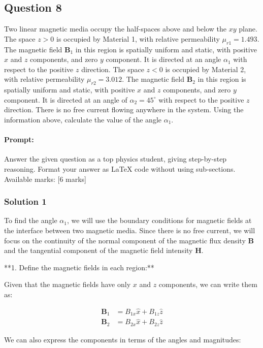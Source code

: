 \documentclass{article}
\begin{document}
\subsection{Question 8}
 Two linear magnetic media occupy the half-spaces above and below the $xy$ plane. The space $z > 0$ is occupied by Material 1, with relative permeability $\mu_{r1} = 1.493$. The magnetic field $\mathbf{B}_1$ in this region is spatially uniform and static, with positive $x$ and $z$ components, and zero $y$ component. It is directed at an angle $\alpha_1$ with respect to the positive $z$ direction. The space $z < 0$ is occupied by Material 2, with relative permeability $\mu_{r2} = 3.012$. The magnetic field $\mathbf{B}_2$ in this region is spatially uniform and static, with positive $x$ and $z$ components, and zero $y$ component. It is directed at an angle of $\alpha_2 = 45^\circ$ with respect to the positive $z$ direction. There is no free current flowing anywhere in the system. Using the information above, calculate the value of the angle $\alpha_1$.

\paragraph{Prompt: \\} 
Answer the given question as a top physics student, giving step-by-step reasoning. Format your answer as LaTeX code without using sub-sections. Available marks: [6 marks]

\subsubsection{Solution 1}
To find the angle $\alpha_1$, we will use the boundary conditions for magnetic fields at the interface between two magnetic media. Since there is no free current, we will focus on the continuity of the normal component of the magnetic flux density $\mathbf{B}$ and the tangential component of the magnetic field intensity $\mathbf{H}$.

**1. Define the magnetic fields in each region:**

Given that the magnetic fields have only $x$ and $z$ components, we can write them as:

\begin{align*}
\mathbf{B}_1 &= B_{1x} \hat{x} + B_{1z} \hat{z} \\
\mathbf{B}_2 &= B_{2x} \hat{x} + B_{2z} \hat{z}
\end{align*}

We can also express the components in terms of the angles and magnitudes:
\end{document}
